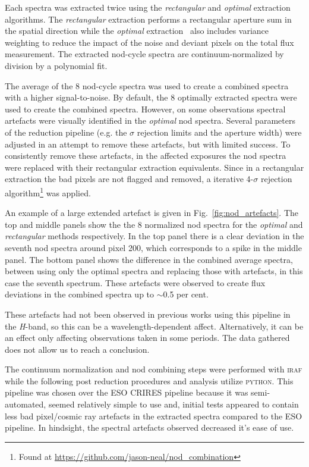 \documentclass[fleqn,usenatbib]{mnras}
\newcommand*\bl{\color{blue}}
\begin{document}
    Each spectra was extracted twice using the \emph{rectangular} and \emph{optimal} extraction algorithms.
    The \emph{rectangular} extraction performs a rectangular aperture sum in the spatial direction while the \emph{optimal} extraction~\citep{horne_optimal_1986} also includes variance weighting to reduce the impact of the noise and deviant pixels on the total flux measurement. {\bl The extracted nod-cycle spectra are continuum-normalized by division by a polynomial fit.}
    
    The average of the 8 nod-cycle spectra was used to create a combined spectra with a higher signal-to-noise.
    {\bl By default, the 8 optimally extracted spectra were used to create the combined spectra. However, on some observations spectral artefacts were visually identified in the \emph{optimal} nod spectra. Several parameters of the reduction pipeline (e.g. the $\sigma$ rejection limits and the aperture width) were adjusted in an attempt to remove these artefacts, but with limited success.
    To consistently remove these artefacts, in the affected exposures the nod spectra were replaced with their rectangular extraction equivalents. Since in a rectangular extraction the bad pixels are not flagged and removed, a iterative 4-\(\sigma\) rejection algorithm\footnote{Found at \url{https://github.com/jason-neal/nod_combination}} was applied.}
    
    An example of a large extended artefact is given in Fig.~\ref{fig:nod_artefacts}. The top and middle panels show the the 8 normalized nod spectra for the \emph{optimal} and \emph{rectangular} methods respectively. In the top panel there is a clear deviation in the seventh nod spectra around pixel 200, which corresponds to a spike in the middle panel. The bottom panel shows the difference in the combined average spectra, between using only the optimal spectra and replacing those with artefacts, in this case the seventh spectrum. These artefacts were observed to create flux deviations in the combined spectra up to \(\sim\)0.5 per cent.
    
    These artefacts had not been observed in previous works using this pipeline in the \textit{H}-band, so this {\bl can be a wavelength-dependent affect. Alternatively, it can be an effect only affecting observations taken in some periods. The data gathered does not allow us to reach a conclusion.}
    
    The continuum normalization and nod combining steps were performed with \textsc{iraf} while the following post reduction procedures and analysis utilize \textsc{python}. This pipeline was chosen over the ESO CRIRES pipeline because it was semi-automated, seemed relatively simple to use and, initial tests appeared to contain less bad pixel/cosmic ray artefacts in the extracted spectra compared to the ESO pipeline. In hindsight, the spectral artefacts observed decreased it's ease of use.
    
\end{document}
